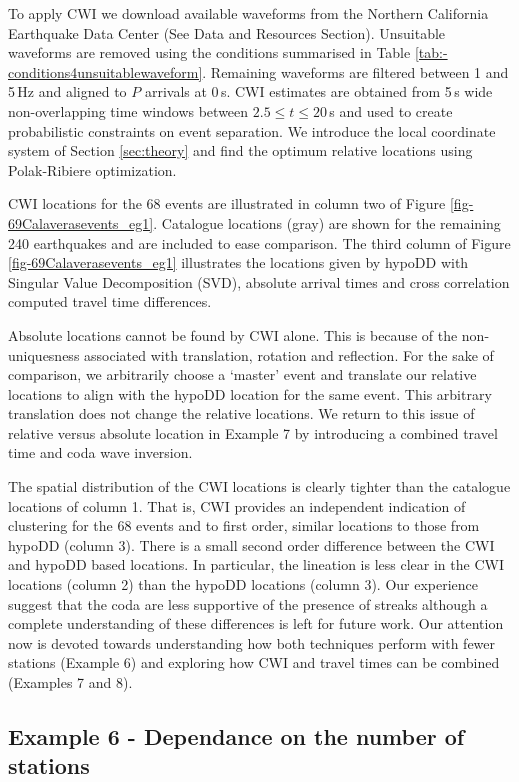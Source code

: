 \documentclass[extra, onecolumn, doublespacing]{gji}
\begin{document}
To apply CWI we download available waveforms from the Northern
California Earthquake Data Center (See Data and Resources Section).
Unsuitable waveforms are removed using the conditions summarised in
Table \ref{tab:-conditions4unsuitablewaveform}. Remaining waveforms
are filtered between 1 and 5\,Hz and aligned  to $P$ arrivals at
0\,s. CWI estimates are obtained from 5\,s wide non-overlapping time
windows between $2.5 \leq t \leq 20$\,s and used to create
probabilistic constraints on event separation. We introduce the
local coordinate system of Section \ref{sec:theory} and find the
optimum relative locations using Polak-Ribiere optimization.

CWI locations for the 68 events are illustrated in column two of
Figure \ref{fig-69Calaverasevents_eg1}. Catalogue locations (gray)
are shown for the remaining 240 earthquakes and are included to ease
comparison. The third column of Figure
\ref{fig-69Calaverasevents_eg1} illustrates the locations given by
hypoDD with Singular Value Decomposition (SVD), absolute arrival
times and cross correlation computed travel time differences.

Absolute locations cannot be found by CWI alone. This is because of
the non-uniquesness associated with translation, rotation and
reflection. For the sake of comparison, we arbitrarily choose a
`master' event and translate our relative locations to align with
the hypoDD location for the same event. This arbitrary translation
does not change the relative locations. We return to this issue of
relative versus absolute location in Example 7 by introducing a
combined travel time and coda wave inversion.

The spatial distribution of the CWI locations is clearly tighter
than the catalogue locations of column 1. That is, CWI provides an
independent indication of clustering for the 68 events and to first
order, similar locations to those from hypoDD (column 3). There is a
small second order difference between the CWI and hypoDD based
locations. In particular, the lineation is less clear in the CWI
locations (column 2) than the hypoDD locations (column 3). Our
experience suggest that the coda are less supportive of the presence of
streaks although a complete understanding of these differences is
left for future work. Our attention now is devoted towards
understanding how both techniques perform with fewer stations
(Example 6) and exploring how CWI and travel times can be combined
(Examples 7 and 8).


\subsection{Example 6 - Dependance on the number of stations}
\end{document}
